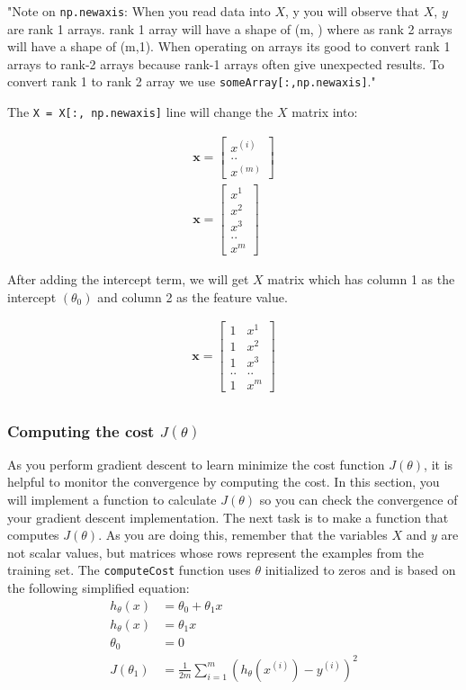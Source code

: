 \documentclass[12pt]{article}
\begin{document}
"Note on \texttt{np.newaxis}: When you read data into $X$, y you will observe that $X$, $y$ are rank 1 arrays. rank 1 array will have a shape of (m, ) where as rank 2 arrays will have a shape of (m,1). When operating on arrays its good to convert rank 1 arrays to rank-2 arrays because rank-1 arrays often give unexpected results. To convert rank 1 to rank 2 array we use \texttt{someArray[:,np.newaxis]}." \citep{srikar2018}

The \texttt{X = X[:, np.newaxis]} line will change the $X$ matrix into:

\begin{align}
  \mathbf x = \begin{bmatrix} x^{(i)} \\ .. \\ x^{(m)}  
  \end{bmatrix} \\
  \mathbf x = \begin{bmatrix} x^1 \\ x^2 \\ x^3 \\ .. \\ x^m\end{bmatrix}
\end{align}

After adding the intercept term, we will get $X$ matrix which has column 1 as the intercept $(\theta_0)$ and column 2 as the feature value.

\begin{align}
  \mathbf x = \begin{bmatrix} 1 & x^1 \\ 1 & x^2 \\ 1 & x^3 \\ .. & .. \\ 1 & x^m\end{bmatrix} \\
\end{align}

\subsubsection{Computing the cost $J(\theta)$}
As you perform gradient descent to learn minimize the cost function $J(\theta)$, it is helpful to monitor the convergence by computing the cost. In this section, you will implement a function to calculate $J(\theta)$ so you can check the convergence of your gradient descent implementation.
The next task is to make a function that computes $J(\theta)$. As you are doing this, remember that the variables $X$ and $y$ are not scalar values, but matrices whose rows represent the examples from the training set.
The \texttt{computeCost} function uses $\theta$ initialized to zeros and is based on the following simplified equation:
\begin{align}
    h_\theta(x) & = \theta_0 + \theta_1x  \\
    h_\theta(x) & = \theta_1x  \\
    \theta_0 & = 0 \\
    J(\theta_1) & = \frac{1}{2m}\sum_{i=1}^m{(h_\theta(x^{(i)})-y^{(i)})^2}
\end{align}
\end{document}
